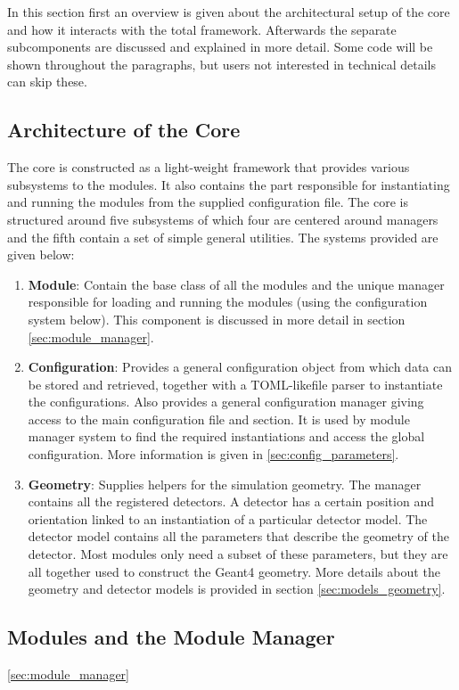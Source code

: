 In this section first an overview is given about the architectural setup of the core and how it interacts with the total \apsq framework. Afterwards the separate subcomponents are discussed and explained in more detail. Some code will be shown throughout the paragraphs, but users not interested in technical details can skip these.

\subsection{Architecture of the Core}
The core is constructed as a light-weight framework that provides various subsystems to the modules. It also contains the part responsible for instantiating and running the modules from the supplied configuration file. The core is structured around five subsystems of which four are centered around managers and the fifth contain a set of simple general utilities. The systems provided are given below:
\begin{enumerate}
\item \textbf{Module}: Contain the base class of all the \apsq modules and the unique manager responsible for loading and running the modules (using the configuration system below). This component is discussed in more detail in section \ref{sec:module_manager}. 
\item \textbf{Configuration}: Provides a general configuration object from which data can be stored and retrieved, together with a TOML-like\needref file parser to instantiate the configurations. Also provides a general \apsq configuration manager giving access to the main configuration file and section. It is used by module manager system to find the required instantiations and access the global configuration. More information is given in \ref{sec:config_parameters}.
\item \textbf{Geometry}: Supplies helpers for the simulation geometry. The manager contains all the registered detectors. A detector has a certain position and orientation linked to an instantiation of a particular detector model. The detector model contains all the parameters that describe the geometry of the detector. Most modules only need a subset of these parameters, but they are all together used to construct the Geant4 geometry. More details about the geometry and detector models is provided in section \ref{sec:models_geometry}.
\end{enumerate}
\subsection{Modules and the Module Manager}
\ref{sec:module_manager}
